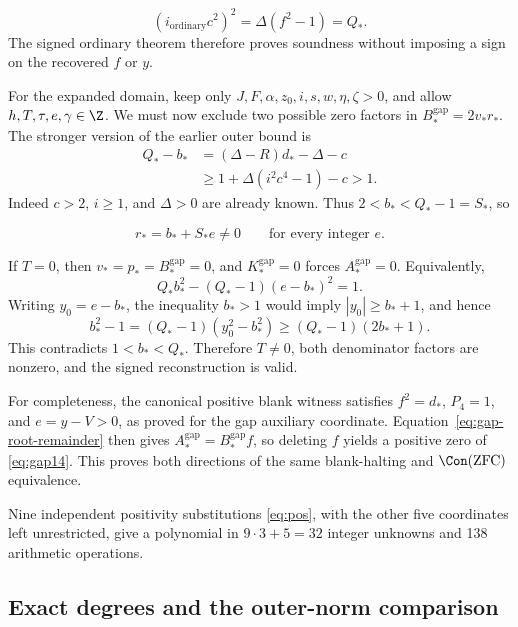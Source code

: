 \[
 (i_{\mathrm{ordinary}}c^2)^2
   =\Delta(f^2-1)=Q_*.
\]
The signed ordinary theorem therefore proves soundness without imposing
a sign on the recovered \(f\) or \(y\).

For the expanded domain, keep only
\(J,F,\alpha,z_0,i,s,w,\eta,\zeta>0\), and allow
\(h,T,\tau,e,\gamma\in\Z\). We must now exclude two possible
zero factors in \(B_*^{\mathrm{gap}}=2v_*r_*\).
The stronger version of the earlier outer bound is
\begin{align*}
 Q_*-b_*&=(\Delta-R)d_*-\Delta-c\\
 &\ge1+\Delta(i^2c^4-1)-c>1.
\end{align*}
Indeed \(c>2\), \(i\ge1\), and \(\Delta>0\) are already known.
Thus \(2<b_*<Q_*-1=S_*\), so

\[
 r_*=b_*+S_*e\ne0
 \qquad\text{for every integer }e.
\]

If \(T=0\), then \(v_*=p_*=B_*^{\mathrm{gap}}=0\), and
\(K_*^{\mathrm{gap}}=0\) forces \(A_*^{\mathrm{gap}}=0\).
Equivalently,
\begin{equation}
 Q_*b_*^2-(Q_*-1)(e-b_*)^2=1.
 \label{eq:gap-zero-T}
\end{equation}
Writing \(y_0=e-b_*\), the inequality \(b_*>1\) would imply
\(|y_0|\ge b_*+1\), and hence
\[
 b_*^2-1=(Q_*-1)(y_0^2-b_*^2)
       \ge(Q_*-1)(2b_*+1).
\]
This contradicts \(1<b_*<Q_*\). Therefore \(T\ne0\), both
denominator factors are nonzero, and the signed reconstruction is valid.

For completeness, the canonical positive blank witness satisfies
\(f^2=d_*\), \(P_4=1\), and \(e=y-V>0\), as proved for the
gap auxiliary coordinate. Equation~\eqref{eq:gap-root-remainder}
then gives \(A_*^{\mathrm{gap}}=B_*^{\mathrm{gap}}f\), so deleting
\(f\) yields a positive zero of \eqref{eq:gap14}. This proves
both directions of the same blank-halting and
\(\Con(\mathrm{ZFC})\) equivalence.

Nine independent positivity substitutions \eqref{eq:pos}, with the
other five coordinates left unrestricted, give a polynomial in
\(9\cdot3+5=32\) integer unknowns and 138 arithmetic operations.

\subsection{Exact degrees and the outer-norm comparison}

